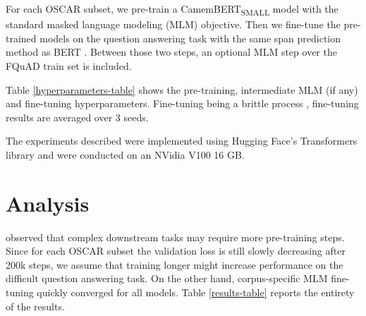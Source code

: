\documentclass[11pt,a4paper]{article}
\begin{document}
For each OSCAR subset, we pre-train a CamemBERT\textsubscript{SMALL} model with the standard masked language modeling (MLM) objective. 
Then we fine-tune the pre-trained models on the question answering task with the same span prediction method as BERT \citep{bert}. Between those two steps, an optional MLM step over the FQuAD train set is included.

Table \ref{hyperparameters-table} shows the pre-training, intermediate MLM (if any) and fine-tuning hyperparameters. 
Fine-tuning being a brittle process \citep{seedfinetuning}, fine-tuning results are averaged over 3 seeds. 

The experiments described were implemented using Hugging Face's Transformers library \citep{huggingface} and were conducted on an NVidia V100 16 GB.

\section{Analysis}

\citet{camembert} observed that complex downstream tasks may require more pre-training steps. Since for each OSCAR subset the validation loss is still slowly decreasing after 200k steps, we assume that training longer might increase performance on the difficult question answering task. On the other hand, corpus-specific MLM fine-tuning quickly converged for all models. Table \ref{results-table} reports the entirety of the results.
\end{document}
